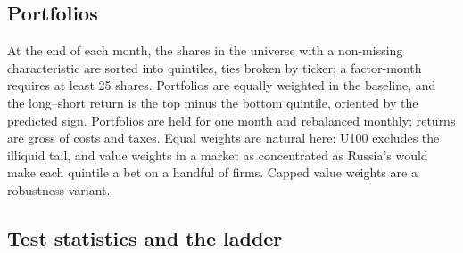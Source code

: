 \documentclass[11pt]{article}
\begin{document}
\subsection{Portfolios}

At the end of each month, the shares in the universe with a non-missing characteristic are sorted into quintiles,
ties broken by ticker; a factor-month requires at least 25 shares. Portfolios are equally weighted in the baseline,
and the long--short return is the top minus the bottom quintile, oriented by the predicted sign. Portfolios are held
for one month and rebalanced monthly; returns are gross of costs and taxes. Equal weights are natural here: U100
excludes the illiquid tail, and value weights in a market as concentrated as Russia's would make each quintile a bet on
a handful of firms. Capped value weights \citep{jensen2023replication} are a robustness variant.

\subsection{Test statistics and the ladder}
\end{document}
